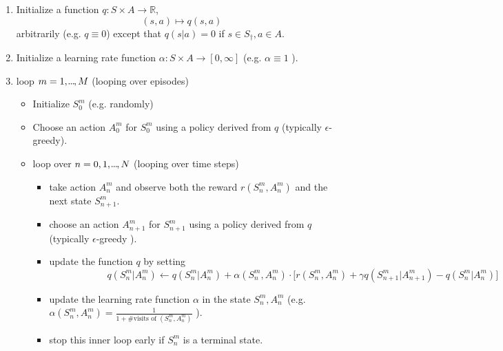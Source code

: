 \begin{enumerate}
    \item Initialize a function \( q: S \times A \to \mathbb{R} \),
    \[
        (s,a) \mapsto q(s,a)
    \] arbitrarily (e.g. \( q \equiv 0 \)) except that \( q(s|a) = 0 \) if \( s \in S_\dagger, a \in A\).
    \item Initialize a learning rate function \( \alpha: S \times A \to [0, \infty] \) (e.g. \( \alpha \equiv 1 \) ).
    
    \item loop \( m=1,\kern-0.10em.\kern-0.06em.\kern-0.06em.\kern-0.1em,M \) (looping over episodes)
    \begin{itemize}
        \item Initialize \( S_0^m \) (e.g. randomly)
        \item Choose an action \( A_0^m \) for \( S_0^m \) using a policy derived from \( q \) (typically \( \epsilon \)-greedy).
        \item loop over \( n=0,1,\kern-0.10em.\kern-0.06em.\kern-0.06em.\kern-0.1em,N \) (looping over time steps)
        \begin{itemize}
            \item take action \( A_n^m \) and observe both the reward \( r(S_n^m, A_n^m) \) and the next state \( S_{n+1}^m \).
            \item choose an action \( A_{n+1}^m \) for \( S_{n+1}^m \) using a policy  derived from \( q \) (typically \( \epsilon \)-greedy ).
            \item update the function \( q \) by setting 
            \[
                \qquad \qquad \qquad q(S_n^m | A_n^m) \leftarrow q(S_n^m | A_n^m) + \alpha(S_n^m, A_n^m) \cdot \bigg[ r(S_n^m, A_n^m) + \gamma q(S_{n+1}^m | A_{n+1}^m)  - q(S_n^m | A_n^m)\bigg]
            \]
            \item update the learning rate function \( \alpha \) in the state \( S_n^m, A_n^m \) (e.g. \( \alpha(S_n^m , A_n^m) = \frac{1}{1+\#\text{visits of } (S_n^m, A_n^m)} \)  ).
            \item stop this inner loop early if \( S_n^m \) is a terminal state.      
        \end{itemize}    
    \end{itemize} 
\end{enumerate}


